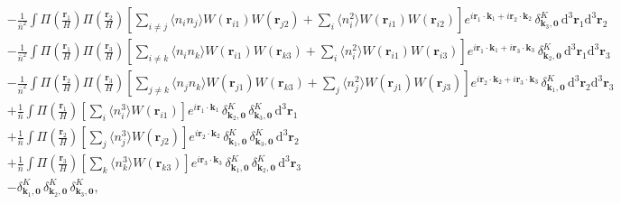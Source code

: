 \documentclass[a4paper,fleqn,usenatbib]{mnras}
\begin{document}
\begin{minipage}{1\columnwidth}
\begin{align}
  &- \frac{1}{\bar{n}^2}\int \Pi\left(\frac{\mathbf{r}_1}{H}\right) \Pi\left(\frac{\mathbf{r}_2}{H}\right)
  \left[\sum_{i\neq j} \langle n_i n_j \rangle W(\mathbf{r}_{i1}) W(\mathbf{r}_{j2})
  +\sum_{i} \langle n_i^2 \rangle W(\mathbf{r}_{i1}) W(\mathbf{r}_{i2}) \right] e^{i \mathbf{r}_1\cdot\mathbf{k}_1 + i \mathbf{r}_2\cdot\mathbf{k}_2} \,
  \delta^K_{\mathbf{k}_3,\mathbf{0}}\,\text{d}^3\mathbf{r}_1 \text{d}^3\mathbf{r}_2 \nonumber\\
  &- \frac{1}{\bar{n}^2}\int \Pi\left(\frac{\mathbf{r}_1}{H}\right) \Pi\left(\frac{\mathbf{r}_3}{H}\right)
  \left[\sum_{i\neq k} \langle n_i n_k \rangle W(\mathbf{r}_{i1}) W(\mathbf{r}_{k3})
  +\sum_{i} \langle n_i^2 \rangle W(\mathbf{r}_{i1}) W(\mathbf{r}_{i3}) \right] e^{i \mathbf{r}_1\cdot\mathbf{k}_1 + i \mathbf{r}_3\cdot\mathbf{k}_3} \,
  \delta^K_{\mathbf{k}_2,\mathbf{0}}\,\text{d}^3\mathbf{r}_1 \text{d}^3\mathbf{r}_3 \nonumber\\
  &- \frac{1}{\bar{n}^2}\int \Pi\left(\frac{\mathbf{r}_2}{H}\right) \Pi\left(\frac{\mathbf{r}_3}{H}\right)
  \left[\sum_{j\neq k} \langle n_j n_k \rangle W(\mathbf{r}_{j1}) W(\mathbf{r}_{k3})+\sum_{j} \langle n_j^2 \rangle W(\mathbf{r}_{j1}) W(\mathbf{r}_{j3}) \right]
  e^{i \mathbf{r}_2\cdot\mathbf{k}_2 + i \mathbf{r}_3\cdot\mathbf{k}_3} \,
  \delta^K_{\mathbf{k}_1,\mathbf{0}}\,\text{d}^3\mathbf{r}_2 \text{d}^3\mathbf{r}_3 \nonumber\\
  &+ \frac{1}{\bar{n}}\int \Pi\left(\frac{\mathbf{r}_1}{H}\right) \left[\sum_i \langle n_i^3 \rangle W(\mathbf{r}_{i1}) \right]
  e^{i \mathbf{r}_1\cdot\mathbf{k}_1} \, \delta^K_{\mathbf{k}_2,\mathbf{0}} \, \delta^K_{\mathbf{k}_3,\mathbf{0}}
  \,\text{d}^3\mathbf{r}_1 \nonumber\\
  &+ \frac{1}{\bar{n}}\int \Pi\left(\frac{\mathbf{r}_2}{H}\right) \left[\sum_j \langle n_j^3 \rangle W(\mathbf{r}_{j2}) \right]
  e^{i \mathbf{r}_2\cdot\mathbf{k}_2} \, \delta^K_{\mathbf{k}_1,\mathbf{0}} \, \delta^K_{\mathbf{k}_3,\mathbf{0}}
  \,\text{d}^3\mathbf{r}_2 \nonumber\\
  &+ \frac{1}{\bar{n}}\int \Pi\left(\frac{\mathbf{r}_3}{H}\right) \left[\sum_k \langle n_k^3 \rangle W(\mathbf{r}_{k3}) \right]
  e^{i \mathbf{r}_3\cdot\mathbf{k}_3} \, \delta^K_{\mathbf{k}_1,\mathbf{0}} \, \delta^K_{\mathbf{k}_2,\mathbf{0}}
  \,\text{d}^3\mathbf{r}_3 \nonumber\\
  &-\delta^K_{\mathbf{k}_1,\mathbf{0}} \, \delta^K_{\mathbf{k}_2,\mathbf{0}} \, \delta^K_{\mathbf{k}_3,\mathbf{0}},
\end{align}

\end{minipage}
\end{document}
